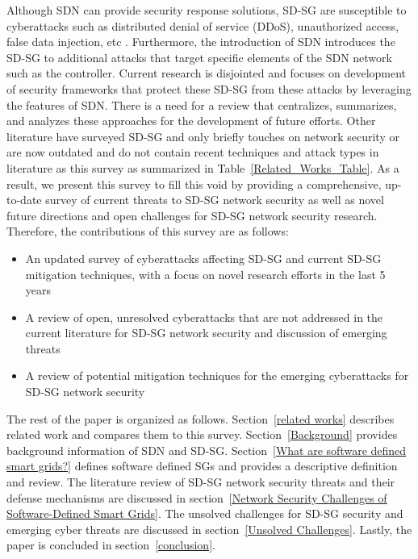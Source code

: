 \documentclass[conference]{IEEEtran}
\begin{document}
  Although SDN can provide security response solutions, SD-SG are susceptible to cyberattacks such as distributed denial of service (DDoS), unauthorized access, false data injection, etc \cite{agnew2022implementation}. Furthermore, the introduction of SDN introduces the SD-SG to additional attacks that target  specific elements of the SDN network such as the controller. Current research is disjointed and focuses on development of security frameworks that protect these SD-SG from these attacks by leveraging the features of SDN. There is a need for a review that centralizes, summarizes, and analyzes these approaches for the development of future efforts. Other literature \cite{rehmani2019software,ibdah2017security,akkaya2015software,abujubbeh2019software, demirci2018software,kim2015trends} have surveyed SD-SG and only briefly touches on network security  or are now outdated and do not contain recent techniques and attack types in literature as this survey as summarized in Table~\ref{Related_Works_Table}. As a result, we present this survey to fill this void by providing a comprehensive, up-to-date survey of current threats to SD-SG network security as well as novel future directions and open challenges for SD-SG network security research. Therefore, the contributions of this survey are as follows:
 \begin{itemize}
     \item An updated survey of cyberattacks affecting SD-SG and current SD-SG mitigation techniques, with a focus on novel research efforts in the last 5 years      
     \item A review of open, unresolved cyberattacks that are not addressed in the current literature for SD-SG network security and discussion of emerging threats
     \item A review of potential mitigation techniques for the emerging cyberattacks for SD-SG network security
 \end{itemize}
 
 The rest of the paper is organized as follows. Section~\ref{related works} describes related work and compares them to this survey. Section~\ref{Background} provides background information of SDN and SD-SG. Section~\ref{What are software defined smart grids?} defines software defined SGs and provides a descriptive definition and review. The literature review of SD-SG network security threats and their defense mechanisms  are discussed in section~\ref{Network Security Challenges of Software-Defined Smart Grids}. The unsolved challenges for SD-SG security and emerging cyber threats are discussed in section~\ref{Unsolved Challenges}. Lastly, the paper is concluded in section~\ref{conclusion}.
\end{document}
